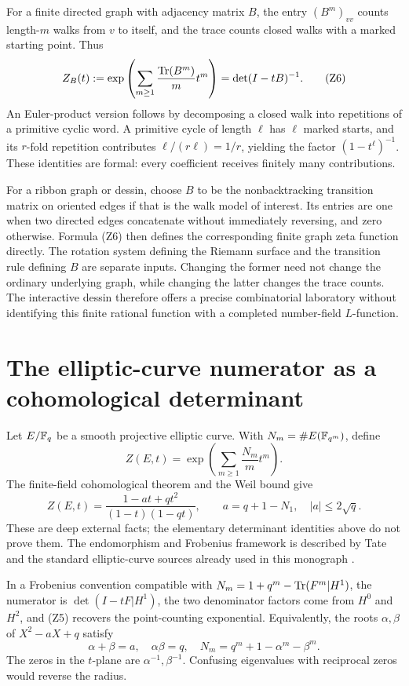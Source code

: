 For a finite directed graph with adjacency matrix \(B\), the entry \((B^m)_{vv}\) counts length-\(m\) walks from \(v\) to itself, and the trace counts closed walks with a marked starting point. Thus
\[
 Z_B(t):=\exp\left(\sum_{m\ge1}\frac{\operatorname{Tr}(B^m)}m t^m\right)
       =\det(I-tB)^{-1}.
 \tag{Z6}
\]
An Euler-product version follows by decomposing a closed walk into repetitions of a primitive cyclic word. A primitive cycle of length \(\ell\) has \(\ell\) marked starts, and its \(r\)-fold repetition contributes \(\ell/(r\ell)=1/r\), yielding the factor \((1-t^\ell)^{-1}\). These identities are formal: every coefficient receives finitely many contributions.

For a ribbon graph or dessin, choose \(B\) to be the nonbacktracking transition matrix on oriented edges if that is the walk model of interest. Its entries are one when two directed edges concatenate without immediately reversing, and zero otherwise. Formula (Z6) then defines the corresponding finite graph zeta function directly. The rotation system defining the Riemann surface and the transition rule defining \(B\) are separate inputs. Changing the former need not change the ordinary underlying graph, while changing the latter changes the trace counts. The interactive dessin therefore offers a precise combinatorial laboratory without identifying this finite rational function with a completed number-field \(L\)-function.

\section{The elliptic-curve numerator as a cohomological determinant}
Let \(E/\mathbb{F}_q\) be a smooth projective elliptic curve. With
\(N_m=\#E(\mathbb{F}_{q^m})\), define
\[
 Z(E,t)=\exp\left(\sum_{m\ge1}\frac{N_m}{m}t^m\right).
\]
The finite-field cohomological theorem and the Weil bound give
\[
 Z(E,t)=\frac{1-at+qt^2}{(1-t)(1-qt)},\qquad
 a=q+1-N_1,\quad |a|\le2\sqrt q.
 \tag{Z7}
\]
These are deep external facts; the elementary determinant identities above do not prove them. The endomorphism and Frobenius framework is described by Tate and the standard elliptic-curve sources already used in this monograph \citep{Tate1966Endomorphisms,SilvermanAEC,Sutherland2023Hasse}.

In a Frobenius convention compatible with \(N_m=1+q^m-\operatorname{Tr}(F^m|H^1)\), the numerator is
\(\det(I-tF|H^1)\), the two denominator factors come from \(H^0\) and \(H^2\), and (Z5) recovers the point-counting exponential. Equivalently, the roots \(\alpha,\beta\) of \(X^2-aX+q\) satisfy
\[
 \alpha+\beta=a,\quad \alpha\beta=q,\quad
 N_m=q^m+1-\alpha^m-\beta^m.
\]
The zeros in the \(t\)-plane are \(\alpha^{-1},\beta^{-1}\). Confusing eigenvalues with reciprocal zeros would reverse the radius.

